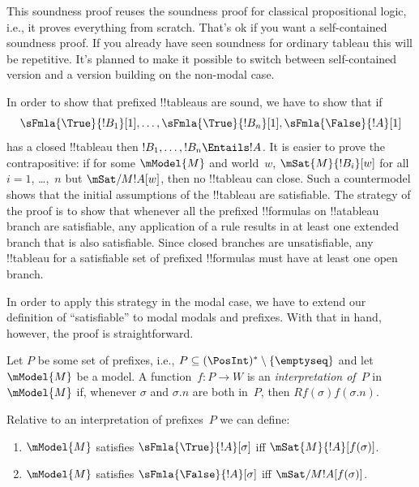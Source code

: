 \documentclass[../../../include/open-logic-section]{subfiles}
\begin{document}


\begin{editorial}
  This soundness proof reuses the soundness proof for classical
  propositional logic, i.e., it proves everything from scratch. That's
  ok if you want a self-contained soundness proof. If you already have
  seen soundness for ordinary tableau this will be repetitive. It's
  planned to make it possible to switch between self-contained version
  and a version building on the non-modal case.
\end{editorial}

\begin{explain}
  In order to show that prefixed !!{tableau}s are sound, we have to
  show that if
  \[
  \sFmla{\True}{!B_1}[1], \dots, \sFmla{\True}{!B_n}[1], \sFmla{\False}{!A}[1]
  \]
  has a closed !!{tableau} then $!B_1, \dots, !B_n \Entails !A$. It is
  easier to prove the contrapositive: if for some $\mModel{M}$ and
  world~$w$, $\mSat{M}{!B_i}[w]$ for all $i=1$, \dots,~$n$ but
  $\mSat/{M}{!A}[w]$, then no !!{tableau} can close. Such a
  countermodel shows that the initial assumptions of the !!{tableau}
  are satisfiable. The strategy of the proof is to show that whenever
  all the prefixed !!{formula}s on !!a{tableau} branch are
  satisfiable, any application of a rule results in at least one
  extended branch that is also satisfiable. Since closed branches are
  unsatisfiable, any !!{tableau} for a satisfiable set of prefixed
  !!{formula}s must have at least one open branch.

  In order to apply this strategy in the modal case, we have to extend
  our definition of ``satisfiable'' to modal modals and prefixes. With
  that in hand, however, the proof is straightforward.
\end{explain}

\begin{defn}
  Let $P$ be some set of prefixes, i.e., $P \subseteq (\PosInt)^*
  \setminus \{\emptyseq\}$ and let $\mModel{M}$ be a model.  A
  function~$f\colon P \to W$ is an \emph{interpretation of}~$P$
  in~$\mModel{M}$ if, whenever $\sigma$ and $\sigma.n$ are both
  in~$P$, then $Rf(\sigma)f(\sigma.n)$.

  Relative to an interpretation of prefixes~$P$ we can define:
  \begin{enumerate}
  \item $\mModel{M}$ satisfies $\sFmla{\True}{!A}[\sigma]$ iff
    $\mSat{M}{!A}[f(\sigma)]$.
  \item $\mModel{M}$ satisfies $\sFmla{\False}{!A}[\sigma]$ iff
    $\mSat/{M}{!A}[f(\sigma)]$.
  \end{enumerate}
\end{defn}
\end{document}
